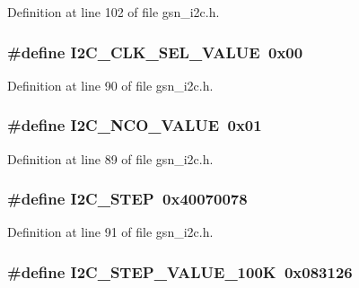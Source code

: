 Definition at line 102 of file gsn\_\-i2c.h.

\hypertarget{a00516_a6cad032e96be8fa3ad31d085c758a573}{
\subsubsection[{I2C\_\-CLK\_\-SEL\_\-VALUE}]{\setlength{\rightskip}{0pt plus 5cm}\#define I2C\_\-CLK\_\-SEL\_\-VALUE~0x00}}
\label{a00516_a6cad032e96be8fa3ad31d085c758a573}


Definition at line 90 of file gsn\_\-i2c.h.

\hypertarget{a00516_a018ca5b94b592748dc0c5067ba5b53b9}{
\subsubsection[{I2C\_\-NCO\_\-VALUE}]{\setlength{\rightskip}{0pt plus 5cm}\#define I2C\_\-NCO\_\-VALUE~0x01}}
\label{a00516_a018ca5b94b592748dc0c5067ba5b53b9}


Definition at line 89 of file gsn\_\-i2c.h.

\hypertarget{a00516_a254ad9d333377934566571cb085a6735}{
\subsubsection[{I2C\_\-STEP}]{\setlength{\rightskip}{0pt plus 5cm}\#define I2C\_\-STEP~0x40070078}}
\label{a00516_a254ad9d333377934566571cb085a6735}


Definition at line 91 of file gsn\_\-i2c.h.

\hypertarget{a00516_ad0d2c364d420c2463f7bc57ee1816acc}{
\subsubsection[{I2C\_\-STEP\_\-VALUE\_\-100K}]{\setlength{\rightskip}{0pt plus 5cm}\#define I2C\_\-STEP\_\-VALUE\_\-100K~0x083126}}
\label{a00516_ad0d2c364d420c2463f7bc57ee1816acc}


